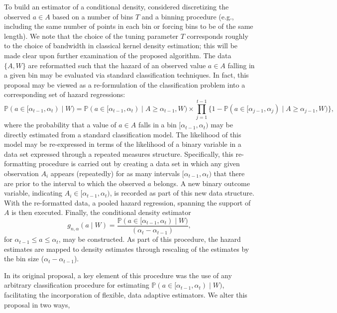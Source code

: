 To build an estimator of a conditional density, \citet{diaz2011super} considered
discretizing the observed $a \in A$ based on a number of bins $T$ and a binning
procedure (e.g., including the same number of points in each bin or forcing
bins to be of the same length). We note that the choice of the tuning parameter
$T$ corresponds roughly to the choice of bandwidth in classical kernel density
estimation; this will be made clear upon further examination of the proposed
algorithm. The data $\{A, W\}$ are reformatted such that the hazard of an
observed value $a \in A$ falling in a given bin may be evaluated via standard
classification techniques. In fact, this proposal may be viewed as
a re-formulation of the classification problem into a corresponding set of
hazard regressions:
\begin{equation*}
   \mathbb{P} (a \in [\alpha_{t-1}, \alpha_t) \mid W) = \mathbb{P} (a \in
   [\alpha_{t-1}, \alpha_t) \mid A \geq \alpha_{t-1}, W) \times
   \prod_{j = 1}^{t -1} \{1 - \mathbb{P} (a \in [\alpha_{j-1}, \alpha_j)
   \mid A \geq \alpha_{j-1}, W) \},
\end{equation*}
where the probability that a value of $a \in A$ falls in a bin $[\alpha_{t-1},
\alpha_t)$ may be directly estimated from a standard classification model. The
likelihood of this model may be re-expressed in terms of the likelihood of
a binary variable in a data set expressed through a repeated measures structure.
Specifically, this re-formatting procedure is carried out by creating a data set
in which any given observation $A_i$ appears (repeatedly) for as many intervals
$[\alpha_{t-1}, \alpha_t)$ that there are prior to the interval to which the
observed $a$ belongs. A new binary outcome variable, indicating $A_i \in
[\alpha_{t-1}, \alpha_t)$, is recorded as part of this new data structure. With
the re-formatted data, a pooled hazard regression, spanning the support of $A$
is then executed. Finally, the conditional density estimator
\begin{equation*}
   g_{n, \alpha}(a \mid W) = \frac{\mathbb{P}(a \in [\alpha_{t-1}, \alpha_t)
      \mid W)}{(\alpha_t - \alpha_{t-1})},
\end{equation*}
for $\alpha_{t-1} \leq a \le \alpha_t$, may be constructed. As part of this
procedure, the hazard estimates are mapped to density estimates through
rescaling of the estimates by the bin size ($\alpha_t - \alpha_{t-1}$).

In its original proposal, a key element of this procedure was the use of any
arbitrary classification procedure for estimating $\mathbb{P}(a \in
[\alpha_{t-1}, \alpha_t) \mid W)$, facilitating the incorporation of flexible,
data adaptive estimators. We alter this proposal in two ways,

